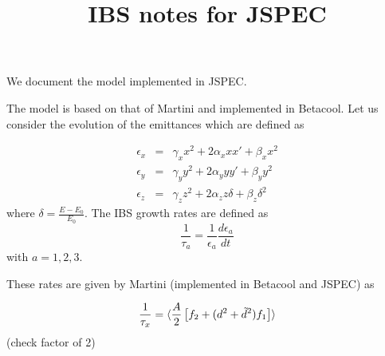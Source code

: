 \documentclass[acus]{article}
\begin{document}
\title{IBS notes for JSPEC}
\maketitle

We document the model implemented in JSPEC.

The model is based on that of Martini and implemented in Betacool.
Let us consider the evolution of the emittances which are defined as

\begin{eqnarray}
\epsilon_x &=& \gamma_x x^2 + 2\alpha_x x x' + \beta_x x^2 \\
\epsilon_y &=& \gamma_y y^2 + 2\alpha_y y y' + \beta_y y^2 \\
\epsilon_z &=& \gamma_z z^2 + 2\alpha_z z \delta + \beta_z \delta^2
\end{eqnarray}
where $\delta = \frac{E-E_0}{E_0}$.  The IBS growth rates are defined as
\begin{equation}
\frac{1}{\tau_{a}} = \frac{1}{\epsilon_{a}}\frac{d\epsilon_{a}}{dt}
\end{equation}
with $a=1,2,3$.

These rates are given by Martini (implemented in Betacool and JSPEC) as

\begin{equation}
\frac{1}{\tau_x} = {\langle \frac{A}{2}\left[f_2 + (d^2 + \tilde{d}^2)f_1\right]\rangle}
\end{equation}
(check factor of 2)


\begin{thebibliography}{3}
\end{thebibliography}
\end{document}
